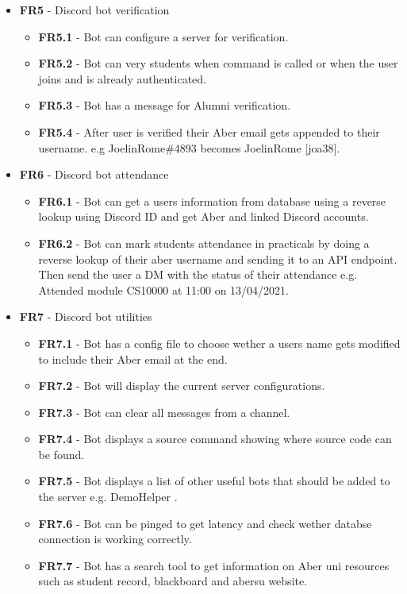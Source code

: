 \begin{itemize}
	\item \textbf{FR5} - Discord bot verification
	\begin{itemize}
		\item \textbf{FR5.1} - Bot can configure a server for verification.
		\item \textbf{FR5.2} - Bot can very students when command is called or when the user joins and is already authenticated.
		\item \textbf{FR5.3} - Bot has a message for Alumni verification.
		\item \textbf{FR5.4} - After user is verified their Aber email gets appended to their username. e.g JoelinRome\#4893 becomes JoelinRome [joa38].
	\end{itemize}

	\item \textbf{FR6} - Discord bot attendance
	\begin{itemize}
		\item \textbf{FR6.1} - Bot can get a users information from database using a reverse lookup using Discord ID and get Aber and linked Discord accounts.
		\item \textbf{FR6.2} - Bot can mark students attendance in practicals by doing a reverse lookup of their aber username and sending it to an API endpoint. Then send the user a DM with the status of their attendance e.g. Attended module CS10000 at 11:00 on 13/04/2021.
	\end{itemize}

	\item \textbf{FR7} - Discord bot utilities
	\begin{itemize}
		\item \textbf{FR7.1} - Bot has a config file to choose wether a users name gets modified to include their Aber email at the end.
		\item \textbf{FR7.2} - Bot will display the current server configurations.
		\item \textbf{FR7.3} - Bot can clear all messages from a channel.
		\item \textbf{FR7.4} - Bot displays a source command showing where source code can be found.
		\item \textbf{FR7.5} - Bot displays a list of other useful bots that should be added to the server e.g. DemoHelper \cite{demohelper}.
		\item \textbf{FR7.6} - Bot can be pinged to get latency and check wether databse connection is working correctly.
		\item \textbf{FR7.7} - Bot has a search tool to get information on Aber uni resources such as student record, blackboard and abersu website. 
	\end{itemize}


\end{itemize}
